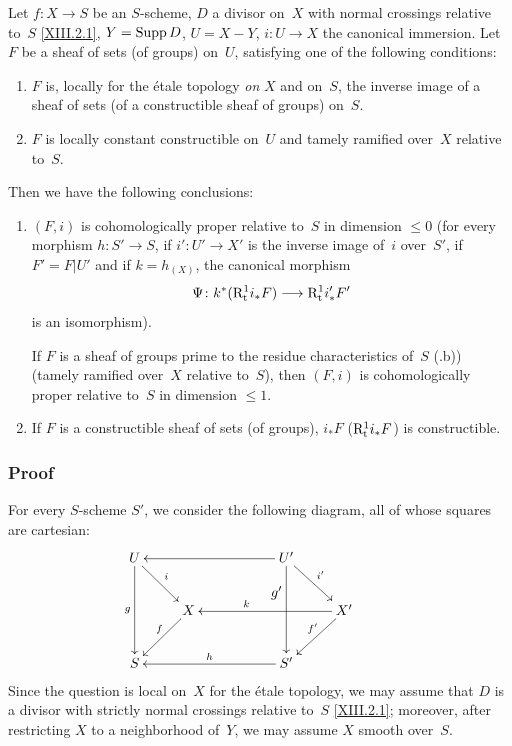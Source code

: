 \begin{theorem}
\label{XIII.2.4}
Let
$f\colon X\to S$ be an $S$-scheme, $D$ a divisor on~$X$
with normal crossings relative to~$S$ \eqref{XIII.2.1},
$Y=\operatorname{Supp} D$, $U=X-Y$, $i\colon U\to X$ the canonical immersion. Let $F$
be a sheaf of sets (\resp of groups) on~$U$, satisfying
one of the following conditions:
\begin{enumerate}
\item[a)] $F$ is, locally for the \'etale topology \emph{on}
$X$ and on~$S$, the inverse image of a sheaf of sets (\resp of a
constructible sheaf of groups) on~$S$.
\item[b)] $F$ is locally constant constructible on~$U$ and
tamely ramified over~$X$ relative to~$S$.
\end{enumerate}
Then we have the following conclusions:
\begin{enumerate}
\item[1)]$(F,i)$ is cohomologically proper relative to~$S$
in dimension $\leq 0$ (\resp for every morphism $h\colon S'\to S$, if
$i'\colon U'\to X'$ is the inverse image of~$i$ over~$S'$, if $F'=F|U'$
and if $k=h_{(X)}$, the canonical morphism
$$
\Psi\colon k^*(\R^1_{\tame}i_*F)\to\R^1_{\tame}i_*'F'
$$
is an isomorphism).

If $F$ is a sheaf of groups prime to the residue characteristics
of~$S$ (.b)) (tamely
ramified over~$X$ relative to~$S$), then $(F,i)$ is
cohomologically proper relative to~$S$ in dimension $\leq 1$.
\item[2)]If $F$ is a constructible sheaf of sets (\resp of groups),
$i_*F$ (\resp $\mathrm{R}^1_{\mathrm{t}}i_*F$) is constructible.
\end{enumerate}
\end{theorem}

\subsubsection*{Proof}
For every $S$-scheme $S'$, we consider the following diagram,
all of whose squares are cartesian:
$$
\xymatrix{ U \ar[dd]_-g \ar[dr]^-i & & & U'\ar[lll] \ar[dd]_{\hbox{\raise10mm\hbox{$g'$}}}
\ar[dr]^-{i'}& \\ & X \ar[dl]_{f\mkern-8mu} & & & X'\ar[lll]_{k\hspace*{1cm}} \ar[dl]_{f'\mkern-10mu} \\ S
& & & S'\ar[lll]_-h & & }
$$
Since
the question is local on~$X$ for the \'etale topology, we may
assume that $D$ is a divisor with strictly normal crossings
relative to~$S$ \eqref{XIII.2.1}; moreover, after
restricting $X$ to a neighborhood of~$Y$, we may assume $X$ smooth
over~$S$.

